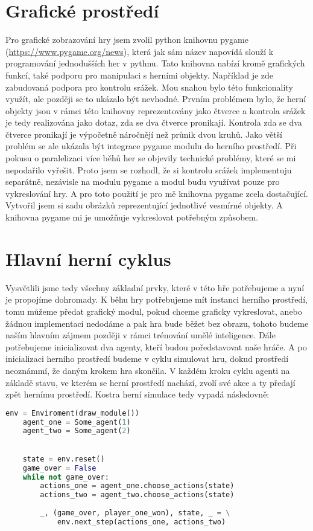 \section{Grafické prostředí}
Pro grafické zobrazování hry jsem zvolil python knihovnu pygame (\url{https://www.pygame.org/news}), která jak sám název napovídá slouží k programování jednodušších her v pythnu.
Tato knihovna nabízí kromě grafických funkcí, také podporu pro manipulaci s herními objekty. Například je zde zabudovaná podpora pro kontrolu srážek.
Mou snahou bylo této funkcionality využít, ale později se to ukázalo být nevhodné.
Prvním problémem bylo, že herní objekty jsou v rámci této knihovny reprezentovány jako čtverce a kontrola srážek je tedy realizována jako dotaz, zda se dva čtverce pronikají.
Kontrola zda se dva čtverce pronikají je výpočetně náročnějí než průnik dvou kruhů.
Jako větší problém se ale ukázala být integrace pygame modulu do herního prostředí. Při pokusu o paralelizaci více běhů her se objevily technické problémy, které se mi nepodařilo vyřešit.
Proto jsem se rozhodl, že si kontrolu srážek implementuju separátně, nezávisle na modulu pygame a modul budu využívat pouze pro vykreslování hry.
A pro toto použití je pro mě knihovna pygame zcela dostačující. Vytvořil jsem si sadu obrázků reprezentující jednotlivé vesmírné objekty. A knihovna pygame mi je umožňuje vykreslovat potřebným způsobem.


\section{Hlavní herní cyklus}
Vysvětlili jsme tedy všechny základní prvky, které v této hře potřebujeme a nyní je propojíme dohromady.
K běhu hry potřebujeme mít instanci herního prostředí, tomu můžeme předat grafický modul, pokud chceme graficky vykreslovat, anebo žádnou implementaci nedodáme a pak hra bude běžet bez obrazu,
tohoto budeme naším hlavním zájmem později v rámci trénování umělé inteligence.
Dále potřebujeme inicializovat dva agenty, kteří budou poředstavovat naše hráče. A po inicializaci herního prostředí budeme v cyklu simulovat hru, dokud prostředí neoznámmí, že daným krokem hra skončila.
V každém kroku cyklu agenti na základě stavu, ve kterém se herní prostředí nachází, zvolí své akce a ty předají zpět hernímu prostředí.
Kostra herní simulace tedy vypadá následovně:

\begin{lstlisting}[language=Python]
    env = Enviroment(draw_module())
    agent_one = Some_agent(1)
    agent_two = Some_agent(2)
    

    state = env.reset()
    game_over = False
    while not game_over:
        actions_one = agent_one.choose_actions(state)    
        actions_two = agent_two.choose_actions(state)
        
        _, (game_over, player_one_won), state, _ = \
            env.next_step(actions_one, actions_two)
\end{lstlisting}